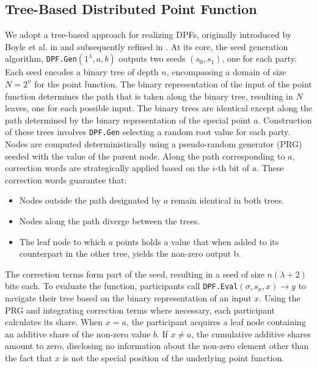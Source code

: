 \subsection{Tree-Based Distributed Point Function}
\label{subsec:treebasedDSPFsImpl}
We adopt a tree-based approach for realizing DPFs, originally introduced by Boyle et al. in \cite{boyle2015function} and subsequently refined in \cite{boyle2016function}. At its core, the seed generation algorithm, \texttt{DPF.Gen}$(1^\lambda, a, b)$ outputs two seeds $(s_0, s_1)$, one for each party. Each seed encodes a binary tree of depth $n$, encompassing a domain of size $N=2^n$ for the point function. The binary representation of the input of the point function determines the path that is taken along the binary tree, resulting in $N$ leaves, one for each possible input. The binary trees are identical except along the path determined by the binary representation of the special point $a$. Construction of these trees involves \texttt{DPF.Gen} selecting a random root value for each party. Nodes are computed deterministically using a pseudo-random generator (PRG) seeded with the value of the parent node. Along the path corresponding to $a$, correction words are strategically applied based on the $i$-th bit of $a$. These correction words guarantee that:
\begin{itemize}
\item Nodes outside the path designated by $a$ remain identical in both trees. 
\item Nodes along the path diverge between the trees.
\item The leaf node to which $a$ points holds a value that when added to its counterpart in the other tree, yields the non-zero output b.
\end{itemize}
The correction terms form part of the seed, resulting in a seed of size $n(\lambda+2)$ bits each. To evaluate the function, participants call \texttt{DPF.Eval}$(\sigma, s_\sigma, x) \rightarrow y$ to navigate their tree based on the binary representation of an input $x$. Using the PRG and integrating correction terms where necessary, each participant calculates its share. When $x=a$, the participant acquires a leaf node containing an additive share of the non-zero value $b$. If $x\neq a$, the cumulative additive shares amount to zero, disclosing no information about the non-zero element other than the fact that $x$ is not the special position of the underlying point function.

